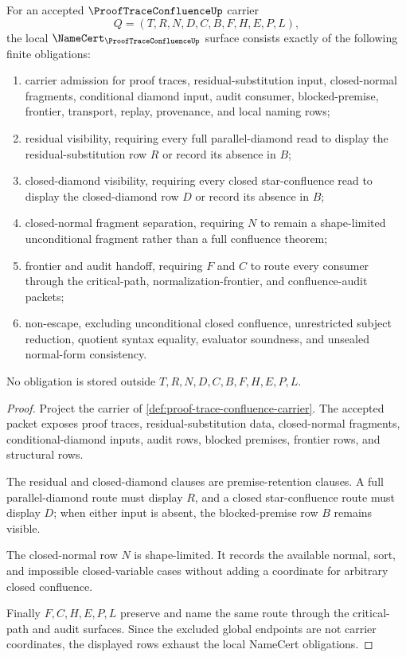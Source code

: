 \begin{theorem}
\label{thm:proof-trace-confluence-obligations}
For an accepted $\ProofTraceConfluenceUp$ carrier
$$
Q=(T,R,N,D,C,B,F,H,E,P,L),
$$
the local $\NameCert_{\ProofTraceConfluenceUp}$ surface consists exactly of the following finite obligations:
\begin{enumerate}
\item carrier admission for proof traces, residual-substitution input, closed-normal fragments, conditional diamond input, audit consumer, blocked-premise, frontier, transport, replay, provenance, and local naming rows;
\item residual visibility, requiring every full parallel-diamond read to display the residual-substitution row $R$ or record its absence in $B$;
\item closed-diamond visibility, requiring every closed star-confluence read to display the closed-diamond row $D$ or record its absence in $B$;
\item closed-normal fragment separation, requiring $N$ to remain a shape-limited unconditional fragment rather than a full confluence theorem;
\item frontier and audit handoff, requiring $F$ and $C$ to route every consumer through the critical-path, normalization-frontier, and confluence-audit packets;
\item non-escape, excluding unconditional closed confluence, unrestricted subject reduction, quotient syntax equality, evaluator soundness, and unsealed normal-form consistency.
\end{enumerate}
No obligation is stored outside $T,R,N,D,C,B,F,H,E,P,L$.
\end{theorem}
\begin{proof}
Project the carrier of \autoref{def:proof-trace-confluence-carrier}. The accepted packet exposes proof traces, residual-substitution data, closed-normal fragments, conditional-diamond inputs, audit rows, blocked premises, frontier rows, and structural rows.

The residual and closed-diamond clauses are premise-retention clauses. A full parallel-diamond route must display $R$, and a closed star-confluence route must display $D$; when either input is absent, the blocked-premise row $B$ remains visible.

The closed-normal row $N$ is shape-limited. It records the available normal, sort, and impossible closed-variable cases without adding a coordinate for arbitrary closed confluence.

Finally $F,C,H,E,P,L$ preserve and name the same route through the critical-path and audit surfaces. Since the excluded global endpoints are not carrier coordinates, the displayed rows exhaust the local NameCert obligations.
\end{proof}

